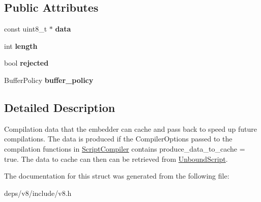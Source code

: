 \subsection*{Public Attributes}
\begin{DoxyCompactItemize}
\item 
\hypertarget{structv8_1_1_script_compiler_1_1_cached_data_a31e313a969170116f98d5a76c110fe61}{}const uint8\+\_\+t $\ast$ {\bfseries data}\label{structv8_1_1_script_compiler_1_1_cached_data_a31e313a969170116f98d5a76c110fe61}

\item 
\hypertarget{structv8_1_1_script_compiler_1_1_cached_data_ad7b8b1b672095a2c33621d3d5b5c7f8f}{}int {\bfseries length}\label{structv8_1_1_script_compiler_1_1_cached_data_ad7b8b1b672095a2c33621d3d5b5c7f8f}

\item 
\hypertarget{structv8_1_1_script_compiler_1_1_cached_data_aa1d16fbd48957df19d4cc1c886afff8f}{}bool {\bfseries rejected}\label{structv8_1_1_script_compiler_1_1_cached_data_aa1d16fbd48957df19d4cc1c886afff8f}

\item 
\hypertarget{structv8_1_1_script_compiler_1_1_cached_data_a1e5c9ff625ac790139aec4294493fe32}{}Buffer\+Policy {\bfseries buffer\+\_\+policy}\label{structv8_1_1_script_compiler_1_1_cached_data_a1e5c9ff625ac790139aec4294493fe32}

\end{DoxyCompactItemize}


\subsection{Detailed Description}
Compilation data that the embedder can cache and pass back to speed up future compilations. The data is produced if the Compiler\+Options passed to the compilation functions in \hyperlink{classv8_1_1_script_compiler}{Script\+Compiler} contains produce\+\_\+data\+\_\+to\+\_\+cache = true. The data to cache can then can be retrieved from \hyperlink{classv8_1_1_unbound_script}{Unbound\+Script}. 

The documentation for this struct was generated from the following file\+:\begin{DoxyCompactItemize}
\item 
deps/v8/include/v8.\+h\end{DoxyCompactItemize}
